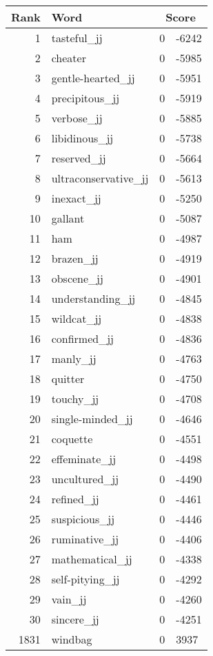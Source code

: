 \begin{longtable}[!htbp]{| rlr@{.}l |}
    \hline
    \textbf{Rank} & \textbf{Word} & \multicolumn{2}{c|}{\textbf{Score}} \\
    \hline
    \endhead
    1 & tasteful\_jj & 0 & -6242 \\
    2 & cheater & 0 & -5985 \\
    3 & gentle-hearted\_jj & 0 & -5951 \\
    4 & precipitous\_jj & 0 & -5919 \\
    5 & verbose\_jj & 0 & -5885 \\
    6 & libidinous\_jj & 0 & -5738 \\
    7 & reserved\_jj & 0 & -5664 \\
    8 & ultraconservative\_jj & 0 & -5613 \\
    9 & inexact\_jj & 0 & -5250 \\
    10 & gallant & 0 & -5087 \\
    11 & ham & 0 & -4987 \\
    12 & brazen\_jj & 0 & -4919 \\
    13 & obscene\_jj & 0 & -4901 \\
    14 & understanding\_jj & 0 & -4845 \\
    15 & wildcat\_jj & 0 & -4838 \\
    16 & confirmed\_jj & 0 & -4836 \\
    17 & manly\_jj & 0 & -4763 \\
    18 & quitter & 0 & -4750 \\
    19 & touchy\_jj & 0 & -4708 \\
    20 & single-minded\_jj & 0 & -4646 \\
    21 & coquette & 0 & -4551 \\
    22 & effeminate\_jj & 0 & -4498 \\
    23 & uncultured\_jj & 0 & -4490 \\
    24 & refined\_jj & 0 & -4461 \\
    25 & suspicious\_jj & 0 & -4446 \\
    26 & ruminative\_jj & 0 & -4406 \\
    27 & mathematical\_jj & 0 & -4338 \\
    28 & self-pitying\_jj & 0 & -4292 \\
    29 & vain\_jj & 0 & -4260 \\
    30 & sincere\_jj & 0 & -4251 \\
    1831 & windbag & 0 & 3937 \\

\end{longtable}
